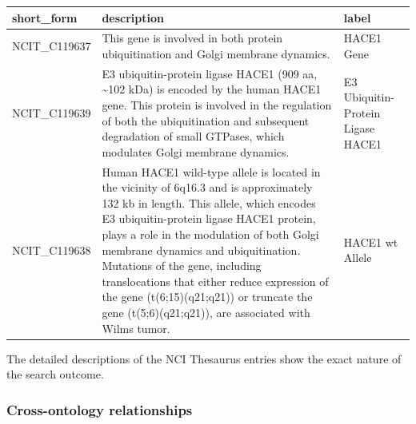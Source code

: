 \documentclass[]{article}
\newcommand{\hlnum}[1]{\textcolor[rgb]{0.816,0.125,0.439}{#1}}%
\newcommand{\hlstr}[1]{\textcolor[rgb]{0.251,0.627,0.251}{#1}}%
\newcommand{\hlopt}[1]{\textcolor[rgb]{0,0,0}{#1}}%
\newcommand{\hlstd}[1]{\textcolor[rgb]{0.251,0.251,0.251}{#1}}%
\newcommand{\hlkwc}[1]{\textcolor[rgb]{0.251,0.251,0.251}{#1}}%
\newcommand{\hlkwd}[1]{\textcolor[rgb]{0.878,0.439,0.125}{#1}}%
\newenvironment{Shaded}{\begin{myshaded}}{\end{myshaded}}
\newcommand{\KeywordTok}[1]{\hlkwd{#1}}
\newcommand{\DataTypeTok}[1]{\hlkwc{#1}}
\newcommand{\DecValTok}[1]{\hlnum{#1}}
\newcommand{\StringTok}[1]{\hlstr{#1}}
\newcommand{\OtherTok}[1]{{#1}}
\newcommand{\OperatorTok}[1]{\hlopt{#1}}
\newcommand{\ErrorTok}[1]{\textcolor{errorcolor}{#1}}
\newcommand{\NormalTok}[1]{\hlstd{#1}}
\begin{document}
\begin{Shaded}
\end{Shaded}

\begin{tabular}[t]{l>{\raggedright\arraybackslash}p{15em}>{\raggedright\arraybackslash}p{15em}}
\toprule
short\_form & description & label\\
\midrule
NCIT\_C119637 & This gene is involved in both protein ubiquitination and Golgi membrane dynamics. & HACE1 Gene\\
NCIT\_C119639 & E3 ubiquitin-protein ligase HACE1 (909 aa, \textasciitilde{}102 kDa) is encoded by the human HACE1 gene. This protein is involved in the regulation of both the ubiquitination and subsequent degradation of small GTPases, which modulates Golgi membrane dynamics. & E3 Ubiquitin-Protein Ligase HACE1\\
NCIT\_C119638 & Human HACE1 wild-type allele is located in the vicinity of 6q16.3 and is approximately 132 kb in length. This allele, which encodes E3 ubiquitin-protein ligase HACE1 protein, plays a role in the modulation of both Golgi membrane dynamics and ubiquitination. Mutations of the gene, including translocations that either reduce expression of the gene (t(6;15)(q21;q21)) or truncate the gene (t(5;6)(q21;q21)), are associated with Wilms tumor. & HACE1 wt Allele\\
\bottomrule
\end{tabular}

The detailed descriptions of the NCI Thesaurus entries show
the exact nature of the search outcome.

\hypertarget{cross-ontology-relationships}{%
\subsubsection{Cross-ontology relationships}\label{cross-ontology-relationships}}
\end{document}
